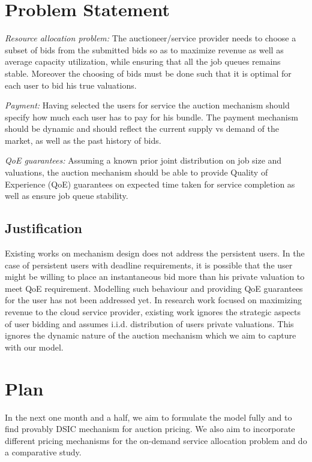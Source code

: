 \documentclass[a4paper,english,12pt]{article}
\begin{document}
\section{Problem Statement}

\textit{Resource allocation problem:} The auctioneer/service provider needs to choose a subset of bids from the submitted bids so as to maximize revenue as well as average capacity utilization, while ensuring that all the job queues remains stable. Moreover the choosing of bids must be done such that it is optimal for each user to bid his true valuations.

\textit{Payment:} Having selected the users for service the auction mechanism should specify how much each user has to pay for his bundle. The payment mechanism should be dynamic and should reflect the current supply vs demand of the market, as well as the past history of bids.

\textit{QoE guarantees:} Assuming a known prior joint distribution on job size and valuations, the auction mechanism should be able to provide Quality of Experience (QoE) guarantees on expected time taken for service completion as well as ensure job queue stability. 
\subsection{Justification}

 Existing works on mechanism design does not address the persistent users. In the case of persistent users with deadline requirements, it is possible that the user might be willing to place an instantaneous bid more than his private valuation to meet QoE requirement. Modelling such behaviour and providing QoE guarantees for the user has not been addressed yet. In research work focused on maximizing revenue to the cloud service provider, existing work ignores the strategic aspects of user bidding and assumes i.i.d. distribution of users private valuations. This ignores the dynamic nature of the auction mechanism which we aim to capture with our model.  
\section{Plan}
In the next one month and a half, we aim to formulate the model fully and to find provably DSIC mechanism for auction pricing. We also aim to incorporate different pricing mechanisms for the on-demand service allocation problem and do a comparative study. 
\end{document}

